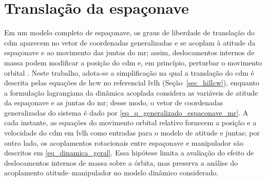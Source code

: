 \section{Translação da espaçonave}
\label{sec_dinAcoplada_translacao_espaconave}

Em um modelo completo de espaçonave, os graus de liberdade de translação do \gls{cdm} aparecem no vetor de coordenadas generalizadas e se acoplam à atitude da espaçonave e ao movimento das juntas do \gls{mr}; assim, deslocamentos internos de massa podem modificar a posição do \gls{cdm} e, em princípio, perturbar o movimento orbital \cite{wie2008space,featherstone2008}.
Neste trabalho, adota-se a simplificação na qual a translação do \gls{cdm} é descrita pelas equações de \gls{hcw} no referencial \gls{lvlh} (Seção~\ref{sec_hillcw}), enquanto a formulação lagrangiana da dinâmica acoplada considera as variáveis de atitude da espaçonave e as juntas do \gls{mr}; desse modo, o vetor de coordenadas generalizadas do sistema é dado por \eqref{eq_q_generalizado_espaconave_mr}.
A cada instante, as equações do movimento orbital relativo fornecem a posição e a velocidade do \gls{cdm} em \gls{lvlh} como entradas para o modelo de atitude e juntas;
por outro lado, os acoplamentos rotacionais entre espaçonave e manipulador são descritos em \eqref{eq_dinamica_geral}.
Essa hipótese limita a avaliação do efeito de deslocamentos internos de massa sobre a órbita, mas preserva a análise do acoplamento atitude--manipulador no modelo dinâmico considerado.
